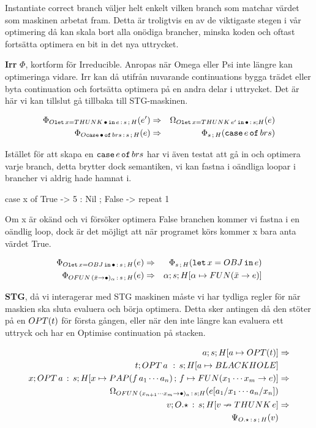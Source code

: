 \documentclass[../Optimise]{subfiles}
\begin{document}
Instantiate correct branch väljer helt enkelt vilken branch som matchar
värdet som maskinen arbetat fram. Detta är troligtvis en av de viktigaste
stegen i vår optimering då kan skala bort alla onödiga brancher, minska
koden och oftast fortsätta optimera en bit in det nya uttrycket.

\textbf{Irr} $\Phi$, kortform för Irreducible. Anropas när Omega eller Psi inte längre
kan optimeringa vidare. Irr kan då utifrån nuvarande continuations
bygga trädet eller byta continuation och fortsätta optimera på en
andra delar i uttrycket. Det är här vi kan tillslut gå tillbaka till
STG-maskinen.

\begin{align*}
\Phi_{O\mathtt{let\,}x=THUNK\,\bullet\,\mathtt{in}\,e\,:\,s\,;\,H}(e') & \Rightarrow & \Omega_{O\mathtt{let\,}x=THUNK\,e'\,\mathtt{in}\,\bullet\,:\,s;H}(e)\\
\Phi_{O\mathtt{case}\,\bullet\,\mathtt{of}\,brs\,:\,s\,;\,H}(e) & \Rightarrow & \Phi_{s\,;\,H}(\mathtt{case}\,e\,\mathtt{of}\,brs)
\end{align*}


Istället för att skapa en $\mathtt{case}\,e\,\mathtt{of}\,brs$ har vi även testat att gå in
och optimera varje branch, detta brytter dock semantiken, vi kan fastna
i oändliga loopar i brancher vi aldrig hade hamnat i. 

\begin{codeEx}
case x of
    { True  -> 5 : Nil
    ; False -> repeat 1
    }
\end{codeEx}
Om x är okänd och vi försöker optimera False branchen kommer vi fastna
i en oändlig loop, dock är det möjligt att när programet körs kommer
x bara anta värdet True. 

\begin{align*}
\Phi_{O\mathtt{let\,}x=OBJ\,\mathtt{in}\,\bullet\,:\,s\,;\,H}(e) & \Rightarrow & \Phi_{s\,;\,H}(\mathtt{let}\,x=OBJ\,\mathtt{in}\,e)\\
\Phi_{OFUN\,(\bar{x}\to\bullet)_{\alpha}\,:\,s\,;\,H}(e) & \Rightarrow & \alpha;s;H[\alpha\mapsto FUN(\bar{x}\to e)]
\end{align*}




\textbf{STG}, då vi interagerar med STG maskinen måste vi har tydliga regler
för när maskien ska sluta evaluera och börja optimera. Detta sker
antingen då den stöter på en $OPT(t)$ för första gången, eller när den
inte längre kan evaluera ett uttryck och har en Optimise continuation
på stacken.

\begin{align*}
a;s;H[a\mapsto OPT(t)] & \Rightarrow\\
t;OPT\,a\,\,:\,s;H[a\mapsto BLACKHOLE]\\
x;OPT\,a\,:\,s;H[x\mapsto PAP(f\,a_{1}\cdots a_{n})\,;\,f\mapsto FUN(x_{1}\cdots x_{m}\to e)] & \Rightarrow\\
\Omega_{OFUN\,(x_{n+1}\cdots x_{m}\to\bullet)_{a}\,:\,s;H}(e[a_{1}/x_{1}\cdots a_{n}/x_{n}])\\
v;O.\star\,:\, s;H[v\nrightarrow THUNK\,e] & \Rightarrow\\
\Psi_{O.\star\,:\, s\,;\,H}(v)
\end{align*}
\end{document}
